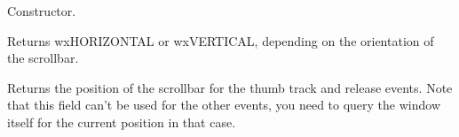 \label{wxscrollwineventctor}


Constructor.

\label{wxscrollwineventgetorientation}


Returns wxHORIZONTAL or wxVERTICAL, depending on the orientation of the scrollbar.

\label{wxscrollwineventgetposition}


Returns the position of the scrollbar for the thumb track and release events.
Note that this field can't be used for the other events, you need to query
the window itself for the current position in that case.


